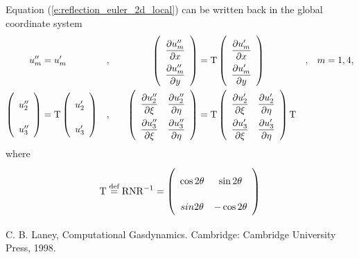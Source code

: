 \documentclass[a4paper,12pt,dvips]{article}
\newcommand*\defeq{\buildrel{\text{def}}\over{=}}
\begin{document}
Equation (\ref{e:reflection_euler_2d_local}) can be written back in the global
coordinate system
\begin{alignat}{4}
\renewcommand{\arraystretch}{2.2}
\begin{aligned}
  u''_m &= u'_m&,& \quad
  &\left(\begin{array}{c}
    \dfrac{\partial u''_m}{\partial x} \\
    \dfrac{\partial u''_m}{\partial y}
  \end{array}\right)
  &= \mathrm{T} \left(\begin{array}{c}
    \dfrac{\partial u'_m}{\partial x} \\
    \dfrac{\partial u'_m}{\partial y}
  \end{array}\right)&,& \quad m = 1, 4, \\
  \left(\begin{array}{c}
    u''_2 \\ u''_3
  \end{array}\right)
  &= \mathrm{T} \left(\begin{array}{c}
    u'_2 \\ u'_3
  \end{array}\right)&,& \quad
  &\left(\begin{array}{cc}
    \dfrac{\partial u''_2}{\partial\xi} &
    \dfrac{\partial u''_2}{\partial\eta} \\
    \dfrac{\partial u''_3}{\partial\xi} &
    \dfrac{\partial u''_3}{\partial\eta}
  \end{array}\right)
  &= \mathrm{T} \left(\begin{array}{cc}
    \dfrac{\partial u'_2}{\partial\xi} &
    \dfrac{\partial u'_2}{\partial\eta} \\
    \dfrac{\partial u'_3}{\partial\xi} &
    \dfrac{\partial u'_3}{\partial\eta}
  \end{array}\right) \mathrm{T}&&
\end{aligned} \label{e:reflection_euler_2d_global}
\end{alignat}
where
\begin{align}
  \mathrm{T} \defeq \mathrm{R}\mathrm{N}\mathrm{R}^{-1}
  = \left(\begin{array}{cc}
    \cos2\theta & \sin2\theta \\ sin2\theta & -\cos2\theta
  \end{array}\right) \label{e:reflection_T}
\end{align}

\begin{thebibliography}{99}
 C. B. Laney, Computational Gasdynamics.
Cambridge: Cambridge University Press, 1998.
\end{thebibliography}
\end{document}

